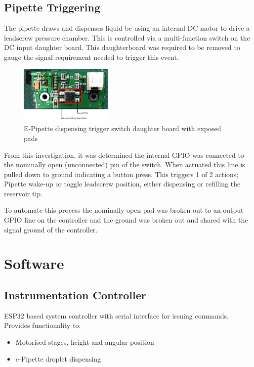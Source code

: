 \subsection{Pipette Triggering}

The pipette draws and dispenses liquid be using an internal DC motor to drive a leadscrew pressure chamber. This is controlled via a multi-function switch on the DC input daughter board. This daughterboard was required to be removed to gauge the signal requirement needed to trigger this event. 

\begin{figure}[h]
    \centering
    \includegraphics[width=0.4\textwidth]{img/trig_brd.png}
    \caption{E-Pipette dispensing trigger switch daughter board with exposed pads}
\end{figure}

From this investigation, it was determined the internal GPIO was connected to the nominally open (unconnected) pin of the switch. When actuated this line is pulled down to ground indicating a button press. This triggers 1 of 2 actions; Pipette wake-up or toggle leadscrew position, either dispensing or refilling the reservoir tip.   

To automate this process the nominally open pad was broken out to an output GPIO line on the controller and the ground was broken out and shared with the signal ground of the controller.

\section{Software}

\subsection{Instrumentation Controller}
ESP32 based system controller with serial interface for issuing commands. Provides functionality to:
\begin{itemize}
    \item Motorised stages, height and angular position
    \item e-Pipette droplet dispensing
\end{itemize}

